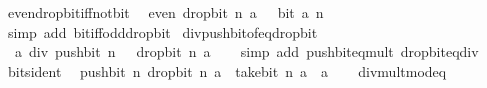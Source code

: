 \begin{isabellebody}
\endisatagproof
{\isafoldproof}%
%
\isadelimproof
\isanewline
%
\endisadelimproof
\isanewline
{}\isamarkupfalse%
\ even{\isacharunderscore}{\kern0pt}drop{\isacharunderscore}{\kern0pt}bit{\isacharunderscore}{\kern0pt}iff{\isacharunderscore}{\kern0pt}not{\isacharunderscore}{\kern0pt}bit{\isacharcolon}{\kern0pt}\isanewline
\ \ {\isacartoucheopen}even\ {\isacharparenleft}{\kern0pt}drop{\isacharunderscore}{\kern0pt}bit\ n\ a{\isacharparenright}{\kern0pt}\ {\isasymlongleftrightarrow}\ {\isasymnot}\ bit\ a\ n{\isacartoucheclose}\isanewline
%
\isadelimproof
\ \ %
\endisadelimproof
%
\isatagproof
{}\isamarkupfalse%
\ {\isacharparenleft}{\kern0pt}simp\ add{\isacharcolon}{\kern0pt}\ bit{\isacharunderscore}{\kern0pt}iff{\isacharunderscore}{\kern0pt}odd{\isacharunderscore}{\kern0pt}drop{\isacharunderscore}{\kern0pt}bit{\isacharparenright}{\kern0pt}%
\endisatagproof
{\isafoldproof}%
%
\isadelimproof
\isanewline
%
\endisadelimproof
\isanewline
{}\isamarkupfalse%
\ div{\isacharunderscore}{\kern0pt}push{\isacharunderscore}{\kern0pt}bit{\isacharunderscore}{\kern0pt}of{\isacharunderscore}{\kern0pt}{}{\isacharunderscore}{\kern0pt}eq{\isacharunderscore}{\kern0pt}drop{\isacharunderscore}{\kern0pt}bit{\isacharcolon}{\kern0pt}\isanewline
\ \ {\isacartoucheopen}a\ div\ push{\isacharunderscore}{\kern0pt}bit\ n\ {}\ {\isacharequal}{\kern0pt}\ drop{\isacharunderscore}{\kern0pt}bit\ n\ a{\isacartoucheclose}\isanewline
%
\isadelimproof
\ \ %
\endisadelimproof
%
\isatagproof
{}\isamarkupfalse%
\ {\isacharparenleft}{\kern0pt}simp\ add{\isacharcolon}{\kern0pt}\ push{\isacharunderscore}{\kern0pt}bit{\isacharunderscore}{\kern0pt}eq{\isacharunderscore}{\kern0pt}mult\ drop{\isacharunderscore}{\kern0pt}bit{\isacharunderscore}{\kern0pt}eq{\isacharunderscore}{\kern0pt}div{\isacharparenright}{\kern0pt}%
\endisatagproof
{\isafoldproof}%
%
\isadelimproof
\isanewline
%
\endisadelimproof
\isanewline
{}\isamarkupfalse%
\ bits{\isacharunderscore}{\kern0pt}ident{\isacharcolon}{\kern0pt}\isanewline
\ \ {\isachardoublequoteopen}push{\isacharunderscore}{\kern0pt}bit\ n\ {\isacharparenleft}{\kern0pt}drop{\isacharunderscore}{\kern0pt}bit\ n\ a{\isacharparenright}{\kern0pt}\ {\isacharplus}{\kern0pt}\ take{\isacharunderscore}{\kern0pt}bit\ n\ a\ {\isacharequal}{\kern0pt}\ a{\isachardoublequoteclose}\isanewline
%
\isadelimproof
\ \ %
\endisadelimproof
%
\isatagproof
{}\isamarkupfalse%
\ div{\isacharunderscore}{\kern0pt}mult{\isacharunderscore}{\kern0pt}mod{\isacharunderscore}{\kern0pt}eq\ \isamarkupfalse%

\end{isabellebody}
